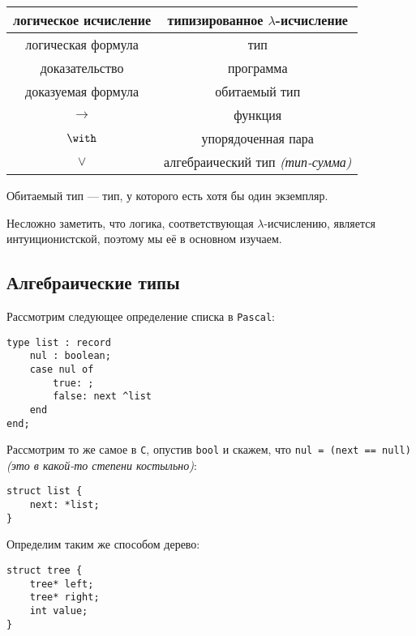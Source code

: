 \documentclass[12pt, a4paper, oneside]{book}
\begin{document}
\begin{tabular}{|c|c|}
    \hline
    логическое исчисление & типизированное \(\lambda\)-исчисление   \\ \hline
    логическая формула    & тип                                     \\
    доказательство        & программа                               \\
    доказуемая формула    & обитаемый тип                           \\
    \( \to \)             & функция                                 \\
    \(\with\)             & упорядоченная пара                      \\
    \(\lor\)              & алгебраический тип \textit{(тип-сумма)} \\
    \hline
\end{tabular}

\begin{remark}
    Обитаемый тип --- тип, у которого есть хотя бы один экземпляр.
\end{remark}

Несложно заметить, что логика, соответствующая \(\lambda\)-исчислению, является интуиционистской, поэтому мы её в основном изучаем.

\subsection{Алгебраические типы}

Рассмотрим следующее определение списка в \texttt{Pascal}:

\begin{verbatim}
type list : record
    nul : boolean;
    case nul of
        true: ;
        false: next ^list
    end
end;
\end{verbatim}

Рассмотрим то же самое в \texttt{C}, опустив \texttt{bool} и скажем, что \texttt{nul = (next == null)} \textit{(это в какой-то степени костыльно)}:

\begin{verbatim}
struct list {
    next: *list;
}
\end{verbatim}

Определим таким же способом дерево:

\begin{verbatim}
struct tree {
    tree* left;
    tree* right;
    int value;
}
\end{verbatim}
\end{document}
